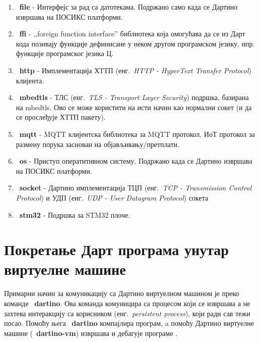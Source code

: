 \documentclass[12pt,oneside]{memoir}
\begin{document}
\begin{enumerate}

\item ~\textbf{file} - Интерфејс за рад са датотекама. Подржано само када се Дартино извршава на ПОСИКС платформи.

\item ~\textbf{ffi} - ,,foreign function interface'' библиотека која омогућава да се из Дарт кода позивају функције дефинисане у неком другом програмском језику, нпр. функције програмског језика Ц.

\item ~\textbf{http} - Имплементација ХТТП (енг.~\textit{HTTP - HyperText Transfer Protocol}) клијента.

\item ~\textbf{mbedtls} - ТЛС (енг.~\textit{TLS - Transport Layer Security}) подршка, базирана на mbedtls. Ово се може користити на исти начин као нормални сокет (и да се прослеђује ХТТП пакету).

\item ~\textbf{mqtt} - MQTT клијентска библиотека за MQTT протокол, ИоТ протокол за размену порука заснован на објављивању/претплати.

\item ~\textbf{os} - Приступ оператитивном систему. Подржано када се Дартино извршава на ПОСИКС платформи.

\item ~\textbf{socket} - Дартино имплементација ТЦП (енг.~\textit{TCP - Transmission Control Protocol}) и УДП (енг.~\textit{UDP - User Datagram Protocol}) сокета

\item ~\textbf{stm32} - Подршка за STM32 плоче.

\end{enumerate}

\section{Покретање Дарт програма унутар виртуелне машине}
\label{sec:pokretanje}

Примарни начин за комуникацију са Дартино виртуелном машином је преко команде ~\textbf{dartino}. Ова команда комуницира са процесом који се извршава а не захтева интеракцију са корисником (енг.~\textit{persistent process}), који ради сав тежи посао. Помоћу њега ~\textbf{dartino} компајлира програм, a помоћу Дартино виртуелне машине (~\textbf{dartino-vm}) извршава и дебагује програме .\\
\end{document}
